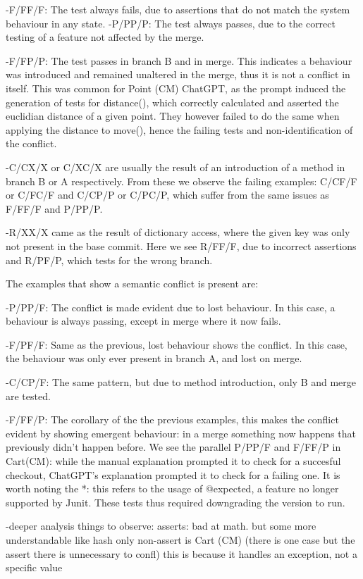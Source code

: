 -F/FF/F: The test always fails, due to assertions that do not match the system behaviour in any state.
-P/PP/P: The test always passes, due to the correct testing of a feature not affected by the merge.

-F/FP/P: The test passes in branch B and in merge. This indicates a behaviour was introduced and remained unaltered in the merge, thus it is not a conflict in itself.
This was common for Point (CM) ChatGPT, as the prompt induced the generation of tests for distance(), which correctly calculated and asserted the euclidian distance of a given point.
They however failed to do the same when applying the distance to move(), hence the failing tests and non-identification of the conflict.

-C/CX/X or C/XC/X are usually the result of an introduction of a method in branch B or A respectively.
From these we observe the failing examples: C/CF/F or C/FC/F and C/CP/P or C/PC/P, which suffer from the same issues as F/FF/F and P/PP/P.

-R/XX/X came as the result of dictionary access, where the given key was only not present in the base commit.
Here we see R/FF/F, due to incorrect assertions and R/PF/P, which tests for the wrong branch.


The examples that show a semantic conflict is present are:

-P/PP/F: The conflict is made evident due to lost behaviour. In this case, a behaviour is always passing, except in merge where it now fails.

-F/PF/F: Same as the previous, lost behaviour shows the conflict. In this case, the behaviour was only ever present in branch A, and lost on merge.

-C/CP/F: The same pattern, but due to method introduction, only B and merge are tested.

-F/FF/P: The corollary of the the previous examples, this makes the conflict evident by showing emergent behaviour: in a merge something now happens that previously didn't happen before.
We see the parallel P/PP/F and F/FF/P in Cart(CM): while the manual explanation prompted it to check for a succesful checkout, ChatGPT's explanation prompted it to check for a failing one.
It is worth noting the *: this refers to the usage of @expected, a feature no longer supported by Junit. These tests thus required downgrading the version to run.




-deeper analysis things to observe:
asserts: bad at math. but some more understandable like hash
only non-assert is Cart (CM) (there is one case but the assert there is unnecessary to confl)
this is because it handles an exception, not a specific value


